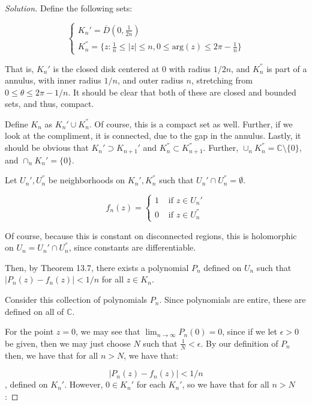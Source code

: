 \documentclass[10pt]{article}
\begin{document}
\begin{proof}[Solution]

Define the following sets:

$$ \begin{cases} K_n' = \overline{D}(0,\frac{1}{2n}) \\ K_n^{''} = \{  z : \frac{1}{n} \leq |z| \leq n, 0 \leq \text{arg}(z) \leq 2\pi - \frac{1}{n} \}  \end{cases}$$ 

That is, $K_n'$ is the closed disk centered at $0$ with radius $1/2n$, and $K_n^{''}$ is part of a annulus, with inner radius $1/n$, and outer radius $n$, stretching from $0 \leq \theta \leq 2\pi - 1/n$. It should be clear that both of these are closed and bounded sets, and thus, compact.

Define $K_n$ as $K_n' \cup K_n^{''}$. Of course, this is a compact set as well. Further, if we look at the compliment, it is connected, due to the gap in the annulus. Lastly, it should be obvious that $K_n' \supset K_{n+1}'$ and $K_n^{''} \subset K_{n+1}^{''}$. Further, $\cup_{n} K_n^{''} = \mathbb{C} \setminus \{ 0 \}$, and $\cap_n K_n' = \{ 0 \}$.

Let $U_n', U_n^{''}$ be neighborhoods on $K_n', K_n^{''}$ such that $U_n' \cap U_n^{''} = \emptyset$.

$$f_n(z) = \begin{cases} 1 & \text{ if } z \in U_n' \\ 0 & \text{ if } z \in U_n^{''} \end{cases} $$

Of course, because this is constant on disconnected regions, this is holomorphic on $U_n = U_n' \cap U_n^{''}$, since constants are differentiable.

Then, by Theorem 13.7, there exists a polynomial $P_n$ defined on $U_n$ such that $| P_n(z) - f_n(z) | < 1/n$ for all $z \in K_n$.

Consider this collection of polynomials $P_n$. Since polynomials are entire, these are defined on all of $\mathbb{C}$. 

For the point $z = 0$, we may see that $\lim_{n \to \infty} P_n(0) = 0$, since if we let $\epsilon > 0$ be given, then we may just choose $N$ such that $\frac{1}{N} < \epsilon$. By our definition of $P_n$ then, we have that for all $n > N$, we have that:

$$| P_n(z) - f_n(z) | < 1/n$$, defined on $K_n'$. However, $0 \in K_n'$ for each $K_n'$, so we have that for all $n > N$:


\end{proof}
\end{document}
